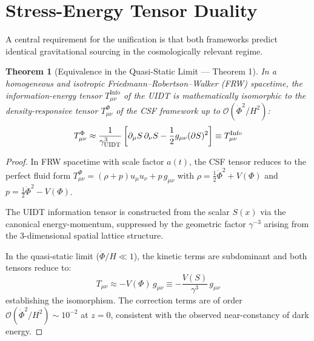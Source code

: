 \documentclass[12pt,a4paper,twoside]{article}
\theoremstyle{plain}
\newtheorem{theorem}{Theorem}[section]
\theoremstyle{definition}
\theoremstyle{remark}
\newcommand{\UIDT}{\textsc{UIDT}}
\newcommand{\CSF}{\textsc{CSF}}
\begin{document}
\section{Stress-Energy Tensor Duality}
\label{sec:tensor_duality}

A central requirement for the unification is that both frameworks predict
identical gravitational sourcing in the cosmologically relevant regime.

\begin{theorem}[Equivalence in the Quasi-Static Limit --- Theorem 1]
\label{thm:tensor_equivalence}
In a homogeneous and isotropic Friedmann--Robertson--Walker (FRW)
spacetime, the information-energy tensor $T_{\mu\nu}^{\mathrm{Info}}$ of
the \UIDT{} is mathematically isomorphic to the density-responsive tensor
$T_{\mu\nu}^{\Phi}$ of the \CSF{} framework up to
$\mathcal{O}(\dot{\Phi}^2/H^2)$:
\begin{equation}
    T_{\mu\nu}^{\Phi} \approx \frac{1}{\gamma_{\UIDT}^3}
    \left[ \partial_\mu S \, \partial_\nu S
    - \frac{1}{2}g_{\mu\nu}(\partial S)^2 \right]
    \equiv T_{\mu\nu}^{\mathrm{Info}}
    \label{eq:tensor_equivalence}
\end{equation}
\end{theorem}

\begin{proof}
In FRW spacetime with scale factor $a(t)$, the \CSF{} tensor reduces to
the perfect fluid form $T_{\mu\nu}^{\Phi} = (\rho + p)u_\mu u_\nu + p\,g_{\mu\nu}$
with $\rho = \frac{1}{2}\dot{\Phi}^2 + V(\Phi)$ and
$p = \frac{1}{2}\dot{\Phi}^2 - V(\Phi)$.

The \UIDT{} information tensor is constructed from the scalar $S(x)$ via
the canonical energy-momentum, suppressed by the geometric factor
$\gamma^{-3}$ arising from the 3-dimensional spatial lattice structure.

In the quasi-static limit ($\dot{\Phi}/H \ll 1$), the kinetic terms are
subdominant and both tensors reduce to:
\begin{equation}
    T_{\mu\nu} \approx -V(\Phi)\,g_{\mu\nu} \equiv
    -\frac{V(S)}{\gamma^3}\,g_{\mu\nu}
\end{equation}
establishing the isomorphism. The correction terms are of order
$\mathcal{O}(\dot{\Phi}^2/H^2) \sim 10^{-2}$ at $z = 0$, consistent
with the observed near-constancy of dark energy.
\end{proof}
\end{document}
